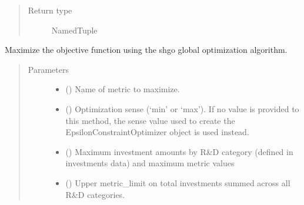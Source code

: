 \documentclass[letterpaper,10pt,english]{sphinxmanual}
\begin{document}
\begin{fulllineitems}
\begin{fulllineitems}
\begin{quote}
\begin{description}
\item[{Return type}] \leavevmode
NamedTuple

\end{description}\end{quote}

\end{fulllineitems}


\begin{fulllineitems}
\label{\detokenize{doc-src/tyche:tyche.EpsilonConstraints.EpsilonConstraintOptimizer.opt_shgo}}
Maximize the objective function using the shgo global optimization
algorithm.
\begin{quote}\begin{description}
\item[{Parameters}] \leavevmode\begin{itemize}
\item {} 
 () \textendash{} Name of metric to maximize.

\item {} 
 () \textendash{} Optimization sense (‘min’ or ‘max’). If no value is provided to
this method, the sense value used to create the
EpsilonConstraintOptimizer object is used instead.

\item {} 
 () \textendash{} Maximum investment amounts by R\&D category (defined in investments data)
and maximum metric values

\item {} 
 () \textendash{} Upper metric\_limit on total investments summed across all R\&D categories.


\end{itemize}
\end{description}
\end{quote}
\end{fulllineitems}
\end{fulllineitems}
\end{document}
